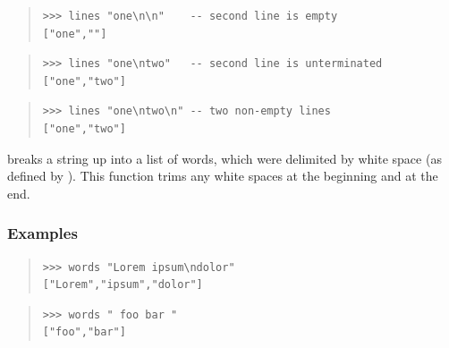 \begin{haddockdesc}
{\begin{quote}
{\begin{verbatim}
\end{verbatim}}
\end{quote}
\begin{quote}
{\haddockverb\begin{verbatim}
>>> lines "one\n\n"    -- second line is empty
["one",""]

\end{verbatim}}
\end{quote}
\begin{quote}
{\haddockverb\begin{verbatim}
>>> lines "one\ntwo"   -- second line is unterminated
["one","two"]

\end{verbatim}}
\end{quote}
\begin{quote}
{\haddockverb\begin{verbatim}
>>> lines "one\ntwo\n" -- two non-empty lines
["one","two"]

\end{verbatim}}
\end{quote}}
\end{haddockdesc}
\begin{haddockdesc}
\item[\begin{tabular}{@{}l}
words :: String -> {\char 91}String{\char 93}
\end{tabular}]
{\haddockbegindoc
{} breaks a string up into a list of words, which were delimited
 by white space (as defined by ). This function trims any white spaces
 at the beginning and at the end.\par
\subsubsection*{\textbf{Examples}}
\begin{quote}
{\haddockverb\begin{verbatim}
>>> words "Lorem ipsum\ndolor"
["Lorem","ipsum","dolor"]

\end{verbatim}}
\end{quote}
\begin{quote}
{\haddockverb\begin{verbatim}
>>> words " foo bar "
["foo","bar"]

\end{verbatim}}
\end{quote}}
\end{haddockdesc}

